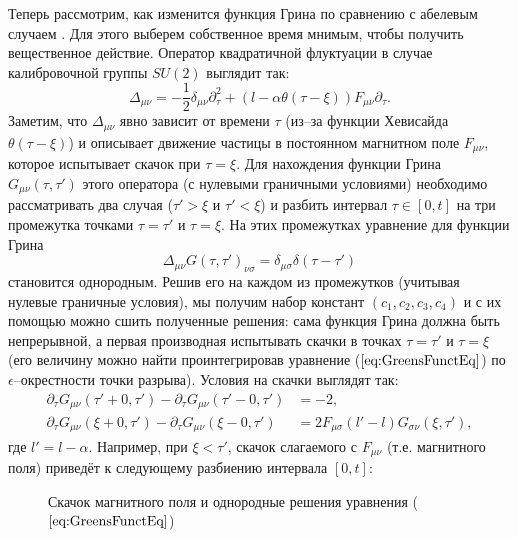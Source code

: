 
Теперь рассмотрим, как изменится функция Грина по сравнению с абелевым случаем \cite{Mnev}. Для этого выберем собственное время мнимым, чтобы получить вещественное действие. Оператор квадратичной флуктуации в случае калибровочной группы $SU(2)$ выглядит так:
\begin{equation*}
	\Delta_{\mu \nu}=-\frac 12 \delta_{\mu \nu}\partial_\tau^2 + (l - \alpha \theta(\tau - \xi)) F_{\mu \nu}\partial_\tau.
\end{equation*}
Заметим, что $\Delta_{\mu \nu}$ явно зависит от времени $\tau$ (из--за функции Хевисайда $\theta(\tau - \xi)$) и описывает движение частицы в постоянном магнитном поле $F_{\mu \nu}$, которое испытывает скачок при $\tau=\xi$. Для нахождения функции Грина $G_{\mu \nu}(\tau, \tau')$ этого оператора (с нулевыми граничными условиями) необходимо рассматривать два случая ($\tau' > \xi$ и $\tau' < \xi$) и разбить интервал $\tau\in [0,t]$ на три промежутка точками $\tau=\tau'$ и $\tau=\xi$. На этих промежутках уравнение для функции Грина
\begin{equation}
	\label{eq:GreensFunctEq}
	\Delta_{\mu \nu}G(\tau,\tau')_{\nu \sigma}=\delta_{\mu \sigma}\delta(\tau-\tau')
\end{equation}
становится однородным. Решив его на каждом из промежутков (учитывая нулевые граничные условия), мы получим набор констант $(c_1,c_2,c_3,c_4)$ и с их помощью можно сшить полученные решения: сама функция Грина должна быть непрерывной, а первая производная испытывать скачки в точках $\tau=\tau'$ и $\tau=\xi$  (его величину можно найти проинтегрировав уравнение ($\ref{eq:GreensFunctEq}$) по $\epsilon$--окрестности точки разрыва). Условия на скачки выглядят так:
\begin{equation}
	\label{eq:BoundCond}
	\begin{split}
		\partial_\tau G_{\mu \nu}(\tau'+0,\tau') - \partial_\tau G_{\mu \nu}(\tau'-0,\tau') &= -2,\\
		\partial_\tau G_{\mu \nu}(\xi+0,\tau') - \partial_\tau G_{\mu \nu}(\xi-0,\tau') &= 2 F_{\mu \sigma} (l'-l) G_{\sigma \nu}(\xi, \tau'),
	\end{split}
\end{equation}
где $l'=l-\alpha$. Например, при $\xi<\tau'$, скачок слагаемого с $F_{\mu \nu}$ (т.е. магнитного поля) приведёт к следующему разбиению интервала $[0,t]$:
\begin{figure}[H]
	\centering
	
	\caption{Скачок магнитного поля и однородные решения уравнения ($\ref{eq:GreensFunctEq}$)}
	\label{fig:axis}
\end{figure}
